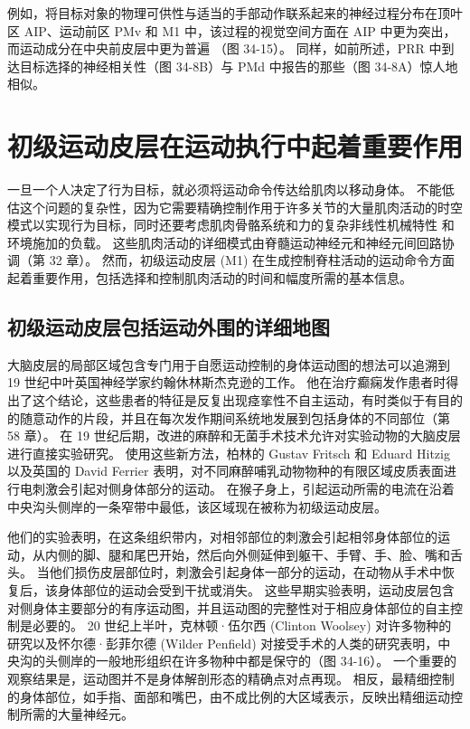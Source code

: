 例如，将目标对象的物理可供性与适当的手部动作联系起来的神经过程分布在顶叶区 AIP、运动前区 PMv 和 M1 中，该过程的视觉空间方面在 AIP 中更为突出，而运动成分在中央前皮层中更为普遍 （图 34-15）。 同样，如前所述，PRR 中到达目标选择的神经相关性（图 34-8B）与 PMd 中报告的那些（图 34-8A）惊人地相似。



\section{初级运动皮层在运动执行中起着重要作用}
一旦一个人决定了行为目标，就必须将运动命令传达给肌肉以移动身体。 不能低估这个问题的复杂性，因为它需要精确控制作用于许多关节的大量肌肉活动的时空模式以实现行为目标，同时还要考虑肌肉骨骼系统和力的复杂非线性机械特性 和环境施加的负载。 这些肌肉活动的详细模式由脊髓运动神经元和神经元间回路协调（第 32 章）。 然而，初级运动皮层 (M1) 在生成控制脊柱活动的运动命令方面起着重要作用，包括选择和控制肌肉活动的时间和幅度所需的基本信息。


\subsection{初级运动皮层包括运动外围的详细地图}
大脑皮层的局部区域包含专门用于自愿运动控制的身体运动图的想法可以追溯到 19 世纪中叶英国神经学家约翰休林斯杰克逊的工作。 他在治疗癫痫发作患者时得出了这个结论，这些患者的特征是反复出现痉挛性不自主运动，有时类似于有目的的随意动作的片段，并且在每次发作期间系统地发展到包括身体的不同部位（第 58 章）。 在 19 世纪后期，改进的麻醉和无菌手术技术允许对实验动物的大脑皮层进行直接实验研究。 使用这些新方法，柏林的 Gustav Fritsch 和 Eduard Hitzig 以及英国的 David Ferrier 表明，对不同麻醉哺乳动物物种的有限区域皮质表面进行电刺激会引起对侧身体部分的运动。 在猴子身上，引起运动所需的电流在沿着中央沟头侧岸的一条窄带中最低，该区域现在被称为初级运动皮层。

他们的实验表明，在这条组织带内，对相邻部位的刺激会引起相邻身体部位的运动，从内侧的脚、腿和尾巴开始，然后向外侧延伸到躯干、手臂、手、脸、嘴和舌头。 当他们损伤皮层部位时，刺激会引起身体一部分的运动，在动物从手术中恢复后，该身体部位的运动会受到干扰或消失。 这些早期实验表明，运动皮层包含对侧身体主要部分的有序运动图，并且运动图的完整性对于相应身体部位的自主控制是必要的。 20 世纪上半叶，克林顿·伍尔西 (Clinton Woolsey) 对许多物种的研究以及怀尔德·彭菲尔德 (Wilder Penfield) 对接受手术的人类的研究表明，中央沟的头侧岸的一般地形组织在许多物种中都是保守的（图 34-16）。 一个重要的观察结果是，运动图并不是身体解剖形态的精确点对点再现。 相反，最精细控制的身体部位，如手指、面部和嘴巴，由不成比例的大区域表示，反映出精细运动控制所需的大量神经元。

